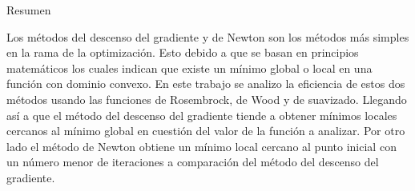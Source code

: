 \begin{center}
    \begin{minipage}{0.85\linewidth}
        \begin{center}
            Resumen
        \end{center}
        \vspace{-0.5cm}
        Los métodos del descenso del gradiente y de Newton son los métodos más simples en la rama de la optimización. Esto debido a que se basan en principios matemáticos los cuales indican que existe un mínimo global o local en una función con dominio convexo. En este trabajo se analizo la eficiencia de estos dos métodos usando las funciones de Rosembrock, de Wood y de suavizado. Llegando así a que el método del descenso del gradiente tiende a obtener mínimos locales cercanos al mínimo global en cuestión del valor de la función a analizar. Por otro lado el método de Newton obtiene un mínimo local cercano al punto inicial con un número menor de iteraciones a comparación del método del descenso del gradiente.
    \end{minipage}
\end{center}